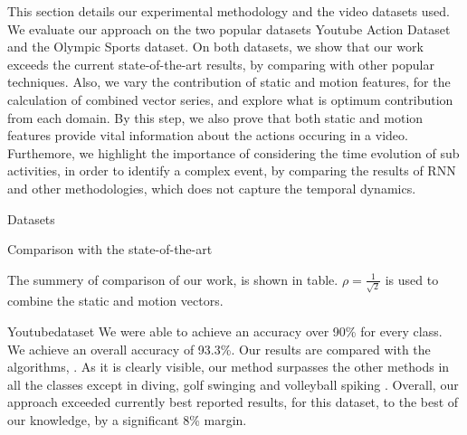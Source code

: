 This section details our experimental methodology and the  video  datasets used. We evaluate our approach on the two popular datasets
Youtube Action Dataset and the Olympic Sports dataset. On both datasets, we show that our work exceeds the current state-of-the-art
results, by comparing with other popular techniques. Also, we vary the contribution of static and motion features, for the calculation
of combined vector series, and explore what is optimum contribution from each domain. By this step, we also prove that both static and motion features
provide vital information about the actions occuring in a video. Furthemore, we highlight the importance of considering the time evolution
of sub activities, in order to identify a complex event, by comparing the results of RNN and other methodologies, which does not capture
the temporal dynamics. 

Datasets


Comparison with the state-of-the-art

The summery of comparison of our work, is shown in table. $\rho = \frac{1}{\sqrt{2}}$ is used to combine the static and motion vectors.

Youtubedataset
We were able to achieve an accuracy over 90\% for every class. We achieve an overall accuracy of 93.3\%. Our results are compared with the
algorithms, . As it is clearly visible, our method surpasses the other
methods in all the classes except in diving, golf swinging
and volleyball spiking . Overall, our approach exceeded currently best reported results, for this dataset, to the best of our knowledge, 
by a significant 8\% margin.